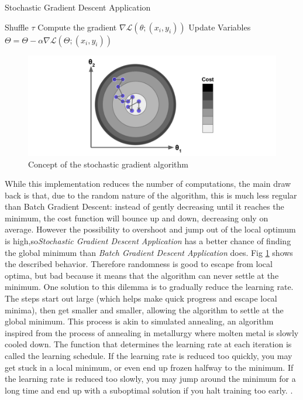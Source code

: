 \documentclass[conference]{IEEEtran}
\begin{document}
\begin{algorithm}
\caption{Stochastic Gradient Descent Application}\label{SGDAal}
\begin{algorithmic}[1]
\State Shuffle $\tau$
\State Compute the gradient $\nabla\mathscr{L}(\theta;(x_i,y_i))$
\State Update Variables $\Theta = \Theta -\alpha\nabla\mathscr{L}(\Theta;(x_i,y_i))$
\EndFor
\EndFor
{}
\end{algorithmic}
\end{algorithm}
\begin{figure}[htbp]
    \includegraphics[scale=0.5]{Fig4.png}
    \caption{Concept of the stochastic gradient algorithm}
    \label{fig:st_grad}
\end{figure}
While this implementation reduces the number of computations, the main draw back is that, due to the random nature of the algorithm, this is much less regular than Batch Gradient Descent: instead of gently decreasing until it reaches the minimum, the cost function will bounce up and down, decreasing only on average. However
the possibility to overshoot and jump out of the local optimum is high,so\textit{Stochastic Gradient Descent Application} has a better chance of finding the global minimum than \textit{Batch Gradient Descent Application} does. Fig \ref{fig:st_grad} shows the described behavior. 
Therefore randomness is good to escape from local optima, but bad because it means that the algorithm can never settle at the minimum. One solution to this dilemma is to gradually reduce the learning rate. The steps start out large (which helps make quick progress and escape local minima), then get smaller and smaller, allowing the algorithm to settle at the global minimum. This process is akin to simulated annealing, an algorithm inspired from the process of annealing in metallurgy where molten metal is slowly cooled down. The function that determines the learning rate at each iteration is called the learning schedule. If the learning rate is reduced too quickly, you may get stuck in a local minimum, or even end up frozen halfway to the minimum. If the learning rate is reduced too slowly, you may jump around the minimum for a long time and end up with a suboptimal solution if you halt training too early. \cite{Scikit-Learn}.
\end{document}
